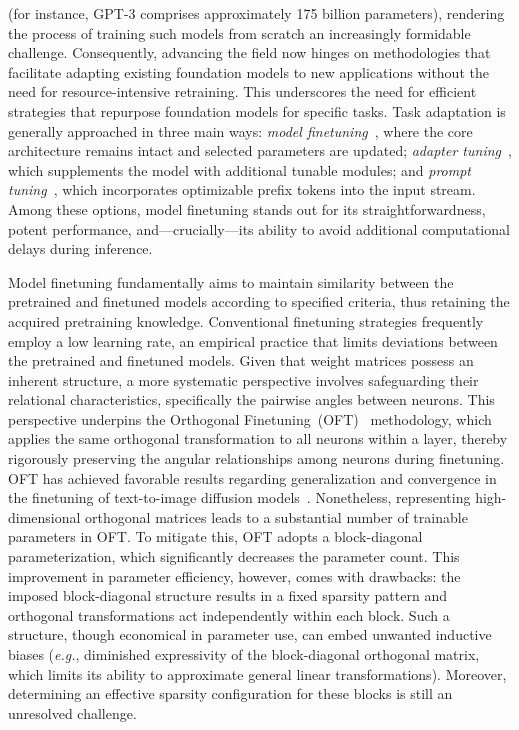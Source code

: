 (for instance, GPT-3 comprises approximately 175 billion parameters), rendering the process of training such models from scratch an increasingly formidable challenge. Consequently, advancing the field now hinges on methodologies that facilitate adapting existing foundation models to new applications without the need for resource-intensive retraining. This underscores the need for efficient strategies that repurpose foundation models for specific tasks. Task adaptation is generally approached in three main ways: \emph{model finetuning}~\cite{hulora2022,zaken2022bitfit,guo2020parameter,raffel2020exploring,qiu2023controlling,zhang2022adaptive,chavan2023one}, where the core architecture remains intact and selected parameters are updated; \emph{adapter tuning}~\cite{rebuffi2017learning,houlsby2019parameter,pfeiffer2020adapterfusion,lin2020exploring,he2021towards}, which supplements the model with additional tunable modules; and \emph{prompt tuning}~\cite{li2021prefix,lester2021power}, which incorporates optimizable prefix tokens into the input stream. Among these options, model finetuning stands out for its straightforwardness, potent performance, and—crucially—its ability to avoid additional computational delays during inference.

Model finetuning fundamentally aims to maintain similarity between the pretrained and finetuned models according to specified criteria, thus retaining the acquired pretraining knowledge. Conventional finetuning strategies frequently employ a low learning rate, an empirical practice that limits deviations between the pretrained and finetuned models. Given that weight matrices possess an inherent structure, a more systematic perspective involves safeguarding their relational characteristics, specifically the pairwise angles between neurons. This perspective underpins the Orthogonal Finetuning~(OFT)~\cite{qiu2023controlling} methodology, which applies the same orthogonal transformation to all neurons within a layer, thereby rigorously preserving the angular relationships among neurons during finetuning. OFT has achieved favorable results regarding generalization and convergence in the finetuning of text-to-image diffusion models~\cite{qiu2023controlling}. Nonetheless, representing high-dimensional orthogonal matrices leads to a substantial number of trainable parameters in OFT. To mitigate this, OFT adopts a block-diagonal parameterization, which significantly decreases the parameter count. This improvement in parameter efficiency, however, comes with drawbacks: the imposed block-diagonal structure results in a fixed sparsity pattern and orthogonal transformations act independently within each block. Such a structure, though economical in parameter use, can embed unwanted inductive biases (\emph{e.g.}, diminished expressivity of the block-diagonal orthogonal matrix, which limits its ability to approximate general linear transformations). Moreover, determining an effective sparsity configuration for these blocks is still an unresolved challenge.

